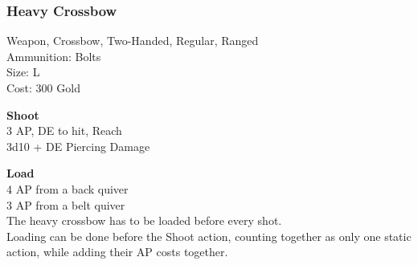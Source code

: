 \subsubsection{Heavy Crossbow}\label{weapon:heavyCrossbow}
Weapon, Crossbow, Two-Handed, Regular, Ranged\\
Ammunition: Bolts\\
Size: L\\
Cost: 300 Gold

\textbf{Shoot} \\
3 AP, DE to hit,  Reach\\
3d10 + \texttimes DE Piercing Damage

\textbf{Load} \\
4 AP from a back quiver\\
3 AP from a belt quiver\\
The heavy crossbow has to be loaded before every shot.\\
Loading can be done before the Shoot action, counting together as only one static action, while adding their AP costs together.

